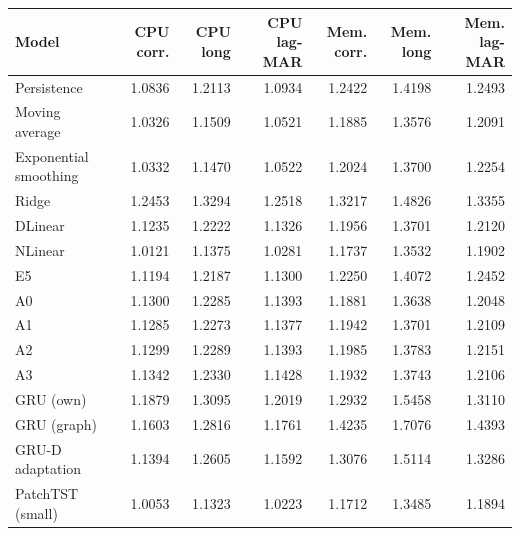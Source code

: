 \begin{tabular}{lrrrrrr}
\toprule
Model & CPU corr. & CPU long & CPU lag-MAR & Mem. corr. & Mem. long & Mem. lag-MAR \\
\midrule
Persistence & 1.0836 & 1.2113 & 1.0934 & 1.2422 & 1.4198 & 1.2493 \\
Moving average & 1.0326 & 1.1509 & 1.0521 & 1.1885 & 1.3576 & 1.2091 \\
Exponential smoothing & 1.0332 & 1.1470 & 1.0522 & 1.2024 & 1.3700 & 1.2254 \\
Ridge & 1.2453 & 1.3294 & 1.2518 & 1.3217 & 1.4826 & 1.3355 \\
DLinear & 1.1235 & 1.2222 & 1.1326 & 1.1956 & 1.3701 & 1.2120 \\
NLinear & 1.0121 & 1.1375 & 1.0281 & 1.1737 & 1.3532 & 1.1902 \\
E5 & 1.1194 & 1.2187 & 1.1300 & 1.2250 & 1.4072 & 1.2452 \\
A0 & 1.1300 & 1.2285 & 1.1393 & 1.1881 & 1.3638 & 1.2048 \\
A1 & 1.1285 & 1.2273 & 1.1377 & 1.1942 & 1.3701 & 1.2109 \\
A2 & 1.1299 & 1.2289 & 1.1393 & 1.1985 & 1.3783 & 1.2151 \\
A3 & 1.1342 & 1.2330 & 1.1428 & 1.1932 & 1.3743 & 1.2106 \\
GRU (own) & 1.1879 & 1.3095 & 1.2019 & 1.2932 & 1.5458 & 1.3110 \\
GRU (graph) & 1.1603 & 1.2816 & 1.1761 & 1.4235 & 1.7076 & 1.4393 \\
GRU-D adaptation & 1.1394 & 1.2605 & 1.1592 & 1.3076 & 1.5114 & 1.3286 \\
PatchTST (small) & 1.0053 & 1.1323 & 1.0223 & 1.1712 & 1.3485 & 1.1894 \\
\bottomrule
\end{tabular}
